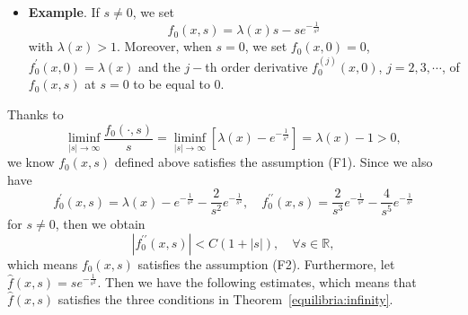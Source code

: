 \documentclass{elsarticle}
\begin{document}
\begin{itemize}
\item \textbf{Example}. If $s\neq0$, we set
	\begin{equation}\label{example}
		f_0(x, s) = \lambda(x)s - se^{-\frac{1}{s^2}}
	\end{equation}
	with $\lambda(x)>1$. Moreover, when $s=0$, we set $f_0(x, 0) = 0$, $f^{\prime}_{0}(x, 0) = \lambda(x)$ and the $j-$th order derivative $f^{(j)}_{0}(x, 0)$, $j=2, 3, \cdots$, of $f_0(x, s)$ at $s=0$ to be equal to $0$.
\end{itemize}

Thanks to
\[
	 \liminf_{|s| \rightarrow \infty}\frac{f_{0}(\cdot, s)}{s} =  \liminf_{|s| \rightarrow \infty}\left[\lambda(x) - e^{-\frac{1}{s^2}}\right] =  \lambda(x) -1> 0,
\]
we know $f_0(x, s)$ defined above satisfies the assumption (F1). Since we also have
\[
	f^{\prime}_{0}(x, s) = \lambda(x) - e^{-\frac{1}{s^2}} - \frac{2}{s^2}e^{-\frac{1}{s^2}},\quad 
	f^{\prime\prime}_{0}(x, s) = \frac{2}{s^3} e^{-\frac{1}{s^2}} - \frac{4}{s^5}e^{-\frac{1}{s^2}}
\]
for $s\neq0$, then we obtain
\[
	|f^{\prime\prime}_{0}(x, s)| < C\left( 1+ |s|\right), \quad  \forall s \in \mathbb{R},
\]
which means $f_0(x, s)$ satisfies the assumption (F2).
Furthermore, let $\hat{f}(x, s) = se^{-\frac{1}{s^2}}$. Then we have the following estimates, which means that $\hat{f}(x, s)$ satisfies the three conditions in Theorem~\ref{equilibria:infinity}. 
\end{document}
